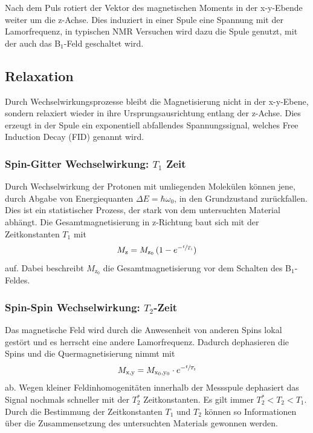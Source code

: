 Nach dem Puls rotiert der Vektor des magnetischen Moments in der x-y-Ebende weiter um die z-Achse.
Dies induziert in einer Spule eine Spannung mit der Lamorfrequenz, in typischen NMR Versuchen wird dazu die Spule genutzt, mit der auch das B$_1$-Feld geschaltet wird.


\subsection{Relaxation}
Durch Wechselwirkungsprozesse bleibt die Magnetisierung nicht in der x-y-Ebene, sondern relaxiert wieder in ihre Ursprungsausrichtung entlang der z-Achse.
Dies erzeugt in der Spule ein exponentiell abfallendes Spannungssignal, welches Free Induction Decay (FID) genannt wird.


\subsubsection{Spin-Gitter Wechselwirkung: $T_1$ Zeit}

Durch Wechselwirkung der Protonen mit umliegenden Molekülen können jene, durch Abgabe von Energiequanten $\Delta E = \hbar \omega_0$, in den Grundzustand zurückfallen.
Dies ist ein statistischer Prozess, der stark von dem untersuchten Material abhängt.
Die Gesamtmagnetisierung in z-Richtung baut sich mit der Zeitkonstanten $T_1$ mit
\begin{equation}
  M_\text{z} = M_\text{z$_0$} \, (1-e^{-\sfrac{t}{T_1}})
  \label{eqn:T1Zeit}
\end{equation}
auf. Dabei beschreibt $M_\text{z$_0$}$ die Gesamtmagnetisierung vor dem Schalten des B$_1$-Feldes.


\subsubsection{Spin-Spin Wechselwirkung: $T_2$-Zeit}

Das magnetische Feld wird durch die Anwesenheit von anderen Spins lokal gestört und es herrscht eine andere Lamorfrequenz.
Dadurch dephasieren die Spins und die Quermagnetisierung nimmt mit
\begin{equation}
  M_\text{x,y} = M_\text{x$_0$,y$_0$} \cdot e^{-\sfrac{t}{T_2}}
  \label{eqn:T2Zeit}
\end{equation}
ab.
Wegen kleiner Feldinhomogenitäten innerhalb der Messspule dephasiert das Signal nochmals schneller mit der $T_2^*$ Zeitkonstanten.
Es gilt immer $T_2^*<T_2<T_1$.
Durch die Bestimmung der Zeitkonstanten $T_1$ und $T_2$ können so Informationen über die Zusammensetzung des untersuchten Materials gewonnen werden.

